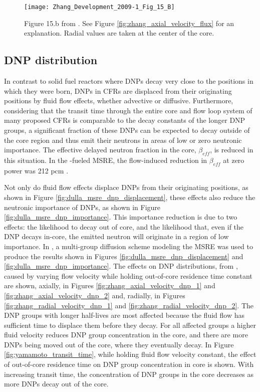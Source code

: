 \documentclass[review]{elsarticle}
\begin{document}
\begin{figure}[H]
   \centering
   \texttt{[image: Zhang\_Development\_2009-1\_Fig\_15\_B]}
   \caption{Figure 15.b from \cite{zhang_development_2009-1}.
            See Figure \ref{fig:zhang_axial_velocity_flux} for an explanation.
               Radial 
               values are taken at the center of the core.}
   \label{fig:zhang_radial_velocity_flux}
\end{figure}

\subsection{DNP distribution} \label{ssec:dnpd}
In contrast to solid fuel reactors where DNPs decay
 very close to the positions in which they were born, DNPs in CFRs are displaced
 from their originating positions by fluid flow effects, whether advective or
 diffusive. Furthermore, considering that the transit time through the entire
 core and flow loop system of many proposed CFRs is comparable to the decay
 constants of the longer DNP groups, a significant fraction of these DNPs can be
expected to decay outside of the core region and thus emit their neutrons in areas
of low or zero neutronic importance. The effective delayed neutron fraction in the
 core, $\beta_{eff}$, is reduced in this situation. In the -fueled MSRE,
 the flow-induced reduction in $\beta_{eff}$ at zero power was 212 pcm \cite{delpech_benchmark_2003}.

\par Not only do fluid flow effects displace DNPs from their originating positions,
as shown in Figure \ref{fig:dulla_msre_dnp_displacement}, these effects also
reduce the neutronic importance of DNPs, as shown in Figure
\ref{fig:dulla_msre_dnp_importance}. This importance reduction is due to two
effects: the likelihood to decay out of core, and the likelihood that, even if the
DNP decays in-core, the emitted neutron will originate in a region of low
importance. In \cite{dulla_models_2005}, a multi-group
diffusion scheme modeling the MSRE was used to produce the results shown
 in Figures
\ref{fig:dulla_msre_dnp_displacement} and \ref{fig:dulla_msre_dnp_importance}.
The effects on DNP distributions, from \cite{zhang_development_2009-1}, caused
by varying flow velocity while holding out-of-core residence time constant are
shown, axially, in Figures \ref{fig:zhang_axial_velocity_dnp_1} and 
\ref{fig:zhang_axial_velocity_dnp_2} and, radially, in Figures
\ref{fig:zhang_radial_velocity_dnp_1} and \ref{fig:zhang_radial_velocity_dnp_2}.
The DNP groups with longer half-lives are most affected because the
fluid flow has sufficient time to displace them before they decay. For all
affected groups a higher fluid velocity reduces DNP group
concentration in the core, and there are more DNPs being moved out of the
 core, where they
eventually decay. In Figure \ref{fig:yamamoto_transit_time},
 while holding fluid flow velocity constant, the effect of
out-of-core residence time on DNP group concentration
in core is shown. With increasing transit time, the concentration
of DNP groups in the core decreases as more DNPs decay out of the core.   
\end{document}
